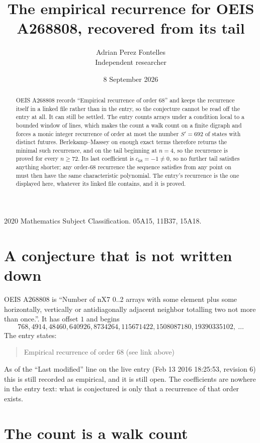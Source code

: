 \documentclass[11pt,a4paper]{article}
\title{The empirical recurrence for OEIS A268808, recovered from its tail}
\author{Adrian Perez Fontelles\\ \small Independent researcher}
\date{8 September 2026}
\theoremstyle{plain}
\theoremstyle{definition}
\begin{document}
\maketitle

\begin{abstract}
OEIS A268808 records ``Empirical recurrence of order $68$'' and keeps the recurrence itself in
a linked file rather than in the entry, so the conjecture cannot be read off the entry at all.
It can still be settled. The entry counts arrays under a condition local to a bounded window of
lines, which makes the count a walk count on a finite digraph and forces a monic integer
recurrence of order at most the number $S'=692$ of states with distinct futures. Berlekamp--Massey on
enough exact terms therefore returns the minimal such recurrence, and on the tail beginning at $n=4$, so the recurrence is proved for every $n\ge72$.
Its last coefficient is $c_{68}=-1\neq0$, so no further tail satisfies anything
shorter; any order-$68$ recurrence the sequence satisfies from any point on must then have
the same characteristic polynomial. The entry's recurrence is the one displayed here, whatever
its linked file contains, and it is proved.
\end{abstract}

\noindent\small 2020 Mathematics Subject Classification. 05A15, 11B37, 15A18.\normalsize

\section{A conjecture that is not written down}

OEIS A268808 is ``Number of nX7 0..2 arrays with some element plus some horizontally, vertically or antidiagonally adjacent neighbor totalling two not more than once.''. It has offset $1$ and begins
\[
768, 4914, 48460, 640926, 8734264, 115671422, 1508087180, 19390335102,\ \dots
\]
The entry states:
\begin{quote}
Empirical recurrence of order 68 (see link above)
\end{quote}
As of the ``Last modified'' line on the live entry (Feb 13 2016 18:25:53, revision 6)
this is still recorded as empirical, and it is still open. The coefficients are nowhere in the
entry text: what is conjectured is only that a recurrence of that order exists.

\section{The count is a walk count}
\end{document}
